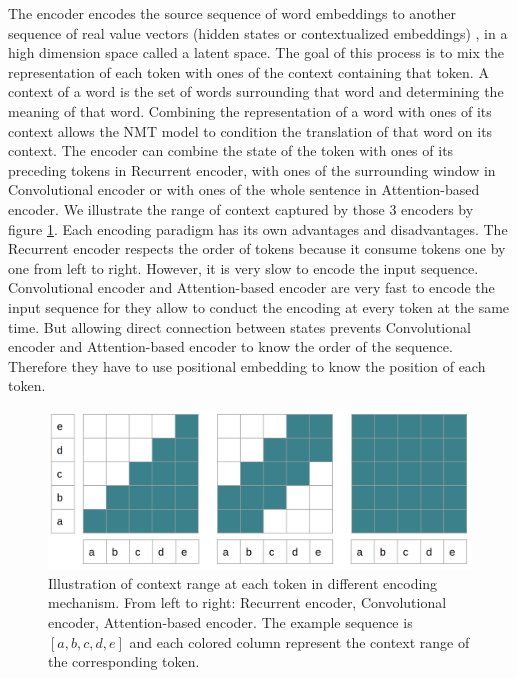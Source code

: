 The encoder encodes the source sequence of word embeddings to another sequence of real value vectors (hidden states or contextualized embeddings) \citep{Vaswani17attention,Bahdanau15learning, Cho14properties}, in a high dimension space called a latent space. The goal of this process is to mix the representation of each token with ones of the context containing that token. A context of a word is the set of words surrounding that word and determining the meaning of that word. Combining the representation of a word with ones of its context allows the NMT model to condition the translation of that word on its context. The encoder can combine the state of the token with ones of its preceding tokens in Recurrent encoder, with ones of the surrounding window in Convolutional encoder or with ones of the whole sentence in Attention-based encoder. We illustrate the range of context captured by those 3 encoders by figure \ref{fig:encoding}. Each encoding paradigm has its own advantages and disadvantages. The Recurrent encoder respects the order of tokens because it consume tokens one by one from left to right. However, it is very slow to encode the input sequence. Convolutional encoder and Attention-based encoder are very fast to encode the input sequence for they allow to conduct the encoding at every token at the same time. But allowing direct connection between states prevents Convolutional encoder and Attention-based encoder to know the order of the sequence. Therefore they have to use positional embedding to know the position of each token. 

\begin{figure}[htbp]
\includegraphics[width=\textwidth]{graphics/encoding.png}
\caption[Illustration of context range at each token in different encoding mechanism]{Illustration of context range at each token in different encoding mechanism. From left to right: Recurrent encoder, Convolutional encoder, Attention-based encoder. The example sequence is $[a,b,c,d,e]$ and each colored column represent the context range of the corresponding token.}
\label{fig:encoding}
\end{figure}

